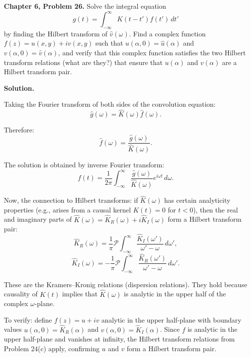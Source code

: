 \documentclass[12pt]{article}
\begin{document}
\textbf{Chapter 6, Problem 26.} Solve the integral equation
\[
g(t) = \int_{-\infty}^{\infty} K(t-t')f(t')\,dt'
\]
by finding the Hilbert transform of $\hat{v}(\omega)$. Find a complex function $f(z) = u(x,y) + iv(x,y)$ such that $u(\alpha,0) = \hat{u}(\alpha)$ and $v(\alpha,0) = \hat{v}(\alpha)$, and verify that this complex function satisfies the two Hilbert transform relations (what are they?) that ensure that $u(\alpha)$ and $v(\alpha)$ are a Hilbert transform pair.

\bigskip
\textbf{Solution.}

Taking the Fourier transform of both sides of the convolution equation:
\[
\hat{g}(\omega) = \hat{K}(\omega)\hat{f}(\omega).
\]

Therefore:
\[
\hat{f}(\omega) = \frac{\hat{g}(\omega)}{\hat{K}(\omega)}.
\]

The solution is obtained by inverse Fourier transform:
\[
f(t) = \frac{1}{2\pi}\int_{-\infty}^{\infty}\frac{\hat{g}(\omega)}{\hat{K}(\omega)}e^{i\omega t}\,d\omega.
\]

Now, the connection to Hilbert transforms: if $\hat{K}(\omega)$ has certain analyticity properties (e.g., arises from a causal kernel $K(t) = 0$ for $t < 0$), then the real and imaginary parts of $\hat{K}(\omega) = \hat{K}_R(\omega) + i\hat{K}_I(\omega)$ form a Hilbert transform pair:
\[
\hat{K}_R(\omega) = \frac{1}{\pi}\mathcal{P}\int_{-\infty}^{\infty}\frac{\hat{K}_I(\omega')}{\omega'-\omega}\,d\omega',
\]
\[
\hat{K}_I(\omega) = -\frac{1}{\pi}\mathcal{P}\int_{-\infty}^{\infty}\frac{\hat{K}_R(\omega')}{\omega'-\omega}\,d\omega'.
\]

These are the Kramers--Kronig relations (dispersion relations). They hold because causality of $K(t)$ implies that $\hat{K}(\omega)$ is analytic in the upper half of the complex $\omega$-plane.

To verify: define $f(z) = u + iv$ analytic in the upper half-plane with boundary values $u(\alpha,0) = \hat{K}_R(\alpha)$ and $v(\alpha,0) = \hat{K}_I(\alpha)$. Since $f$ is analytic in the upper half-plane and vanishes at infinity, the Hilbert transform relations from Problem 24(c) apply, confirming $u$ and $v$ form a Hilbert transform pair.
\end{document}
